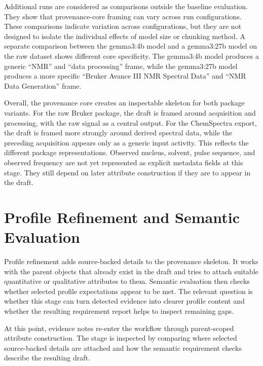 Additional runs are considered as comparisons outside the baseline evaluation.
They show that provenance-core framing can vary across run configurations.
These comparisons indicate variation across configurations, but they are not designed to isolate the individual effects of model size or chunking method.
A separate comparison between the gemma3:4b model and a gemma3:27b model on the raw dataset shows different core specificity.
The gemma3:4b model produces a generic \enquote{NMR} and \enquote{data processing} frame, while the gemma3:27b model produces a more specific \enquote{Bruker Avance III NMR Spectral Data} and \enquote{NMR Data Generation} frame.

Overall, the provenance core creates an inspectable skeleton for both package variants.
For the raw Bruker package, the draft is framed around acquisition and processing, with the raw signal as a central output.
For the ChemSpectra export, the draft is framed more strongly around derived spectral data, while the preceding acquisition appears only as a generic input activity.
This reflects the different package representations.
Observed nucleus, solvent, pulse sequence, and observed frequency are not yet represented as explicit metadata fields at this stage.
They still depend on later attribute construction if they are to appear in the draft.

\section{Profile Refinement and Semantic Evaluation}
\label{sec:evaluation-profile-refinement-observations}

Profile refinement adds source-backed details to the provenance skeleton.
It works with the parent objects that already exist in the draft and tries to attach suitable quantitative or qualitative attributes to them.
Semantic evaluation then checks whether selected profile expectations appear to be met.
The relevant question is whether this stage can turn detected evidence into clearer profile content and whether the resulting requirement report helps to inspect remaining gaps.

At this point, evidence notes re-enter the workflow through parent-scoped attribute construction.
The stage is inspected by comparing where selected source-backed details are attached and how the semantic requirement checks describe the resulting draft.

